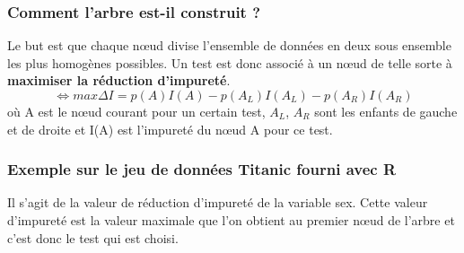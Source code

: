 \documentclass[11pt]{beamer}
\begin{document}
\begin{frame}
\frametitle{Comment l'arbre est-il construit ?}
Le but est que chaque nœud divise l'ensemble de données en deux sous ensemble les plus homogènes possibles.
Un test est donc associé à un nœud de telle sorte à \textbf{maximiser la réduction d'impureté}.\\
\[\Leftrightarrow max \Delta I = p(A)I(A) - p(A_L)I(A_L) - p(A_R)I(A_R)\]
où A est le nœud courant pour un certain test, $A_L$, $A_R$ sont les enfants de gauche et de droite et I(A) est l'impureté du nœud A pour ce test.
\end{frame}

\begin{frame}
\frametitle{Exemple sur le jeu de données Titanic fourni avec R}

Il s'agit de la valeur de réduction d'impureté de la variable sex. Cette valeur d'impureté est la valeur maximale que l'on obtient au premier nœud de l'arbre et c'est donc le test qui est choisi.
\end{frame}
\end{document}
